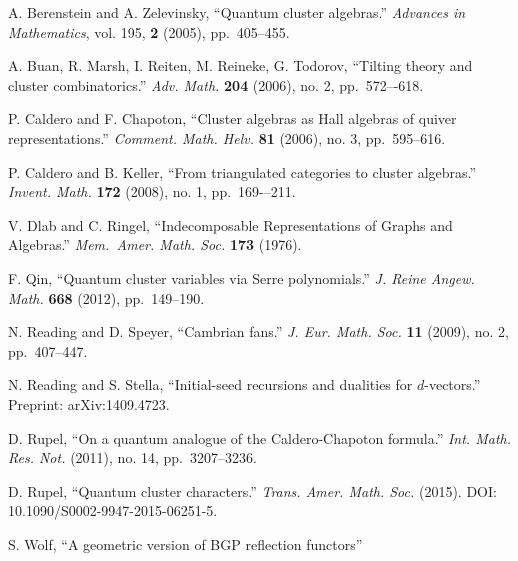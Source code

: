 \documentclass{amsart}
\begin{document}
  \begin{thebibliography}{99}


  A. Berenstein and A. Zelevinsky, ``Quantum cluster algebras.''   {\em Advances in Mathematics}, vol. 195, {\bf 2} (2005), pp.~405--455.

  A. Buan, R. Marsh, I. Reiten, M. Reineke, G. Todorov, ``Tilting theory and cluster combinatorics.'' {\em Adv. Math.} \textbf{204} (2006), no. 2, pp.~572–-618.

  P. Caldero and F. Chapoton, ``Cluster algebras as Hall algebras of quiver representations.'' {\em Comment. Math. Helv.} \textbf{81} (2006), no. 3, pp.~595--616.


  P. Caldero and B. Keller, ``From triangulated categories to cluster algebras.''  {\em Invent. Math.} \textbf{172} (2008), no. 1, pp.~169-–211.





  V. Dlab and C. Ringel, ``Indecomposable Representations of Graphs and Algebras.'' {\em Mem.~Amer. Math. Soc.} \textbf{173} (1976).






  F. Qin, ``Quantum cluster variables via Serre polynomials.''  {\em J. Reine Angew. Math.} \textbf{668} (2012), pp.~149--190.

  N. Reading and D. Speyer, ``Cambrian fans.'' {\em J. Eur. Math. Soc.} \textbf{11} (2009), no. 2, pp.~407--447.

  N. Reading and S. Stella, ``Initial-seed recursions and dualities for $d$-vectors.'' Preprint: arXiv:1409.4723.
   
  D. Rupel, ``On a quantum analogue of the Caldero-Chapoton formula.'' {\em Int. Math. Res. Not.} (2011), no. 14, pp.~3207--3236.

  D. Rupel, ``Quantum cluster characters.'' {\em Trans. Amer. Math. Soc.} (2015). DOI: 10.1090/S0002-9947-2015-06251-5.

  S. Wolf, ``A geometric version of BGP reflection functors''

\end{thebibliography}
\end{document}
